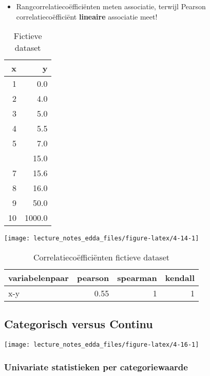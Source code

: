 \documentclass[]{memoir}
\providecommand{\tightlist}{%
  \setlength{\itemsep}{0pt}\setlength{\parskip}{0pt}}
\begin{document}
\begin{itemize}
\tightlist
\item
  Rangcorrelatiecoëfficiënten meten associatie, terwijl Pearson correlatiecoëfficiënt \textbf{lineaire} associatie meet!
\end{itemize}

\begin{table}[t]

\caption{\label{tab:4-13}Fictieve dataset}
\centering
\fontsize{10}{12}\selectfont
\begin{tabular}{rr}
\toprule
x & y\\
\midrule
1 & 0.0\\
2 & 4.0\\
3 & 5.0\\
4 & 5.5\\
5 & 7.0\\
\addlinespace
6 & 15.0\\
7 & 15.6\\
8 & 16.0\\
9 & 50.0\\
10 & 1000.0\\
\bottomrule
\end{tabular}
\end{table}

\texttt{[image: lecture\_notes\_edda\_files/figure-latex/4-14-1]}

\begin{table}[t]

\caption{\label{tab:4-15}Correlatiecoëfficiënten fictieve dataset}
\centering
\fontsize{10}{12}\selectfont
\begin{tabular}{lrrr}
\toprule
variabelenpaar & pearson & spearman & kendall\\
\midrule
x-y & 0.55 & 1 & 1\\
\bottomrule
\end{tabular}
\end{table}

\hypertarget{categorisch-versus-continu}{%
\subsection{Categorisch versus Continu}\label{categorisch-versus-continu}}

\texttt{[image: lecture\_notes\_edda\_files/figure-latex/4-16-1]}

\hypertarget{univariate-statistieken-per-categoriewaarde}{%
\subsubsection*{Univariate statistieken per categoriewaarde}\label{univariate-statistieken-per-categoriewaarde}}
\end{document}
